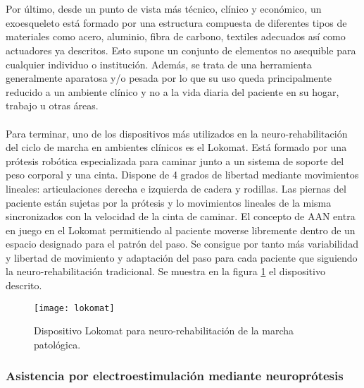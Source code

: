 \\
\\
Por último, desde un punto de vista más técnico, clínico y económico, un exoesqueleto está formado por una estructura compuesta de diferentes tipos de materiales como acero, aluminio, fibra de carbono, textiles adecuados así como actuadores ya descritos. Esto supone un conjunto de elementos no asequible para cualquier individuo o institución. Además, se trata de una herramienta generalmente aparatosa y/o pesada por lo que su uso queda principalmente reducido a un ambiente clínico y no a la vida diaria del paciente en su hogar, trabajo u otras áreas.
\\
\\
Para terminar, uno de los dispositivos más utilizados en la neuro-rehabilitación del ciclo de marcha en ambientes clínicos es el Lokomat\cite{lokomat}. Está formado por una prótesis robótica especializada para caminar junto a un sistema de soporte del peso corporal y una cinta. Dispone de 4 grados de libertad mediante movimientos lineales: articulaciones derecha e izquierda de cadera y rodillas. Las piernas del paciente están sujetas por la prótesis y lo movimientos lineales de la misma sincronizados con la velocidad de la cinta de caminar. El concepto de AAN entra en juego en el Lokomat permitiendo al paciente moverse libremente dentro de un espacio designado para el patrón del paso. Se consigue por tanto más variabilidad y libertad de movimiento y adaptación del paso para cada paciente que siguiendo la neuro-rehabilitación tradicional. Se muestra en la figura \ref{fig:lokomat} el dispositivo descrito.\\

\begin{figure}[!htb]
\centering
{}
  \texttt{[image: lokomat]}
  \caption{Dispositivo Lokomat para neuro-rehabilitación de la marcha patológica\cite{lokomat_imagen}.}\label{fig:lokomat}
\endminipage\hfill
\end{figure}

\subsubsection{Asistencia por electroestimulación mediante neuroprótesis}


